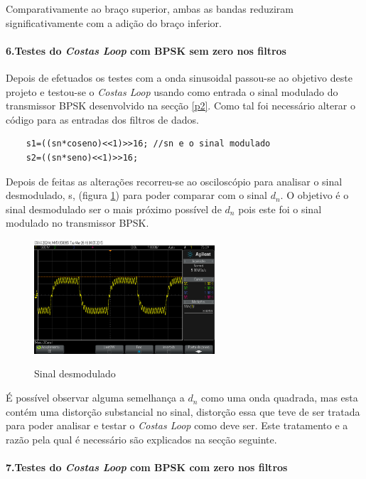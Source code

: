 \documentclass[11pt]{article}
\numberwithin{equation}{section}
\begin{document}
	Comparativamente ao braço superior, ambas as bandas reduziram significativamente com a adição do braço inferior.
	
	\paragraph{6.Testes do \textit{Costas Loop} com BPSK sem zero nos filtros} \hspace{0pt} \label{para:P3-6}
	
	Depois de efetuados os testes com a onda sinusoidal passou-se ao objetivo deste projeto e testou-se o \textit{Costas Loop} usando como entrada o sinal modulado do transmissor BPSK desenvolvido na secção \ref{p2}. Como tal foi necessário alterar o código para as entradas dos filtros de dados.
	\begin{lstlisting}
	s1=((sn*coseno)<<1)>>16; //sn e o sinal modulado
	s2=((sn*seno)<<1)>>16;
	\end{lstlisting}
	Depois de feitas as alterações recorreu-se ao osciloscópio para analisar o sinal desmodulado, s, (figura \ref{demod_sz}) para poder comparar com o sinal $d_n$. O objetivo é o sinal desmodulado ser o mais próximo possível de $d_n$ pois este foi o sinal modulado no transmissor BPSK.
	\begin{figure}[H]
		\centering
		\includegraphics[width=0.6\textwidth]{./demod_semzero}~\\
		\caption{Sinal desmodulado}
		\label{demod_sz}
	\end{figure}
	É possível observar alguma semelhança a $d_n$ como uma onda quadrada, mas esta contém uma distorção substancial no sinal, distorção essa que teve de ser tratada para poder analisar e testar o \textit{Costas Loop} como deve ser. Este tratamento e a razão pela qual é necessário são explicados na secção seguinte.
	\paragraph{7.Testes do \textit{Costas Loop} com BPSK com zero nos filtros} \hspace{0pt} \label{para:P3-7}
	
\end{document}
